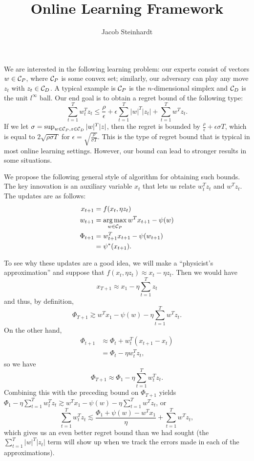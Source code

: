 \documentclass[11pt]{article}
\title{Online Learning Framework}
\author{Jacob Steinhardt}
\begin{document}
\maketitle
We are interested in the following learning problem: our experts 
consist of vectors $w \in \mathcal{C}_P$, where $\mathcal{C}_P$ is some convex 
set; similarly, our adversary can play any move $z_t$ with 
$z_t \in \mathcal{C}_D$. A typical example is $\mathcal{C}_P$ is the $n$-dimensional 
simplex and $\mathcal{C}_D$ is the unit $l^{\infty}$ ball. Our end goal is 
to obtain a regret bound of the following type:
\[ \sum_{t=1}^T w_t^Tz_t \leq \frac{\rho}{\epsilon} + \epsilon \sum_{t=1}^T |w|^T|z_t| + \sum_{t=1}^T w^Tz_t. \]
If we let $\sigma = \sup_{w \in \mathcal{C}_P, z \in \mathcal{C}_D} |w|^T|z|$, then the regret is bounded by
$\frac{\rho}{\epsilon} + \epsilon \sigma T$, which is equal to $2\sqrt{\rho \sigma T}$ for 
$\epsilon = \sqrt{\frac{\rho}{\sigma T}}$. This is the type of regret bound that is typical 
in most online learning settings. However, our bound can lead to stronger results in some 
situations.

We propose the following general style of algorithm for obtaining such 
bounds. The key innovation is an auxiliary variable $x_t$ that lets us 
relate $w_t^Tz_t$ and $w^Tz_t$. The updates are as follows:
\begin{align*}
x_{t+1} &= f(x_t, \eta z_t) \\
w_{t+1} &= \argmax_{w \in \sC_P} w^Tx_{t+1} - \psi(w) \\
\Phi_{t+1} &= w_{t+1}^Tx_{t+1} - \psi(w_{t+1})  \\ &= \psi^*(x_{t+1}).
\end{align*}

To see why these updates are a good idea, we will make a ``physicist's approximation'' 
and suppose that $f(x_t, \eta z_t) \approx x_t - \eta z_t$. Then we would have
\[ x_{T+1} \approx x_1 - \eta \sum_{t=1}^T z_t \] and thus, by definition, 
\[ \Phi_{T+1} \gtrsim w^Tx_1 - \psi(w) - \eta \sum_{t=1}^T w^Tz_t. \]
On the other hand, 
\begin{align*}
\Phi_{t+1} &\approx \Phi_t + w_t^T(x_{t+1} - x_t) \\
           &= \Phi_t - \eta w_t^T z_t,
\end{align*}
so we have 
\[ \Phi_{T+1} \approx \Phi_1 - \eta \sum_{t=1}^T w_t^Tz_t. \]
Combining this with the preceding bound on $\Phi_{T+1}$ yields
$\Phi_1 - \eta \sum_{t=1}^T w_t^Tz_t \gtrsim w^Tx_1 - \psi(w) - \eta \sum_{t=1}^T w^Tz_t$, 
or
\[ \sum_{t=1}^T w_t^Tz_t \lesssim \frac{\Phi_1 + \psi(w) - w^Tx_1}{\eta} + \sum_{t=1}^T w^Tz_t, \]
which gives us an even better regret bound than we had sought (the $\sum_{t=1}^T |w|^T|z_t|$ term 
will show up when we track the errors made in each of the approximations).
\end{document}
